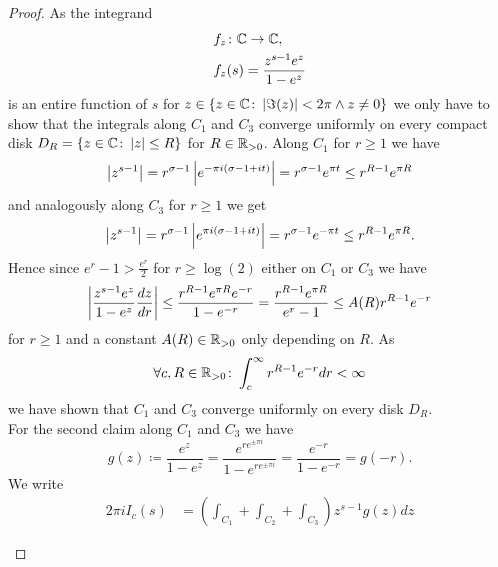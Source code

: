\begin{proof}
	As the integrand
\begin{equation*}
\begin{aligned}
	&f_z \colon \mathbb{C} \to \mathbb{C},\\
	&f_z(s) = \frac{z^{s - 1} e^z}{1 - e^z}
\end{aligned}
\end{equation*}
	is an entire function of $s$ for $z \in \{ z \in \mathbb{C} \colon \left|\Im(z)\right| < 2 \pi \land z \neq 0 \}$ we only have to show that the integrals along $C_1$ and $C_3$ converge uniformly on every compact disk $D_R = \{ z \in \mathbb{C} \colon \left|z\right| \leq R \}$ for $R \in \mathbb{R}_{> 0}$. Along $C_1$ for $r \geq 1$ we have
\begin{equation*}
	\left|z^{s - 1}\right| = r^{\sigma - 1} \left|e^{-\pi i (\sigma - 1 + i t)}\right| = r^{\sigma - 1} e^{\pi t} \leq r^{R - 1} e^{\pi R}
\end{equation*}
	and analogously along $C_3$ for $r \geq 1$ we get
\begin{equation*}
	\left|z^{s - 1}\right| = r^{\sigma - 1} \left|e^{\pi i (\sigma - 1 + i t)}\right| = r^{\sigma - 1} e^{-\pi t} \leq r^{R - 1} e^{\pi R}.
\end{equation*}
	Hence since $e^r - 1 > \frac{e^r}{2}$ for $r \geq \log(2)$ either on $C_1$ or $C_3$ we have
\begin{equation*}
	\left|\frac{z^{s - 1} e^z}{1 - e^z} \frac{dz}{dr}\right| \leq \frac{r^{R - 1} e^{\pi R} e^{-r}}{1 - e^{-r}} = \frac{r^{R - 1} e^{\pi R}}{e^{r} - 1} \leq A(R) r^{R - 1} e^{-r}
\end{equation*}
	for $r \geq 1$ and a constant $A(R) \in \mathbb{R}_{> 0}$ only depending on $R$. As
\begin{equation*}
	\forall c, R \in \mathbb{R}_{> 0} \colon \int _c ^\infty r^{R - 1} e^{-r} dr < \infty
\end{equation*}
	we have shown that $C_1$ and $C_3$ converge uniformly on every disk $D_R$. \\
	For the second claim along $C_1$ and $C_3$ we have 
\begin{equation*}
	g(z) \coloneqq \frac{e^z}{1 - e^z} = \frac{e^{r e^{\pm \pi i}}}{1 - e^{r e^{\pm \pi i}}} = \frac{e^{-r}}{1 - e^{-r}} = g(-r).
\end{equation*}
	We write
\begin{equation*}
\begin{aligned}
	2 \pi i I_c(s)
	&= \left(\int _{C_1} + \int _{C_2} + \int _{C_3}\right) z^{s - 1} g(z) dz \\
	&\begin{aligned}

\end{aligned}
\end{aligned}
\end{equation*}
\end{proof}
